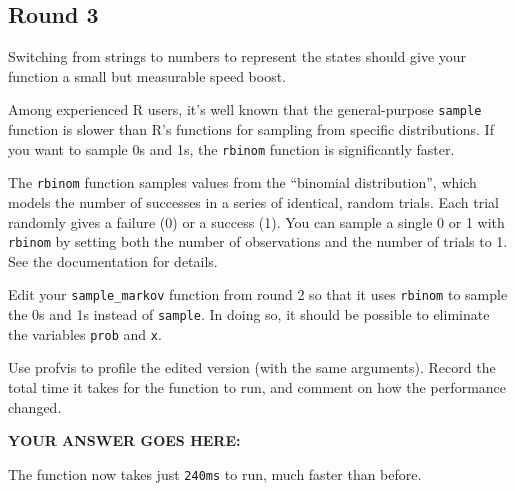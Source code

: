 \documentclass[
]{article}
\begin{document}
\hypertarget{round-3}{%
\subsection{Round 3}\label{round-3}}

Switching from strings to numbers to represent the states should give
your function a small but measurable speed boost.

Among experienced R users, it's well known that the general-purpose
\texttt{sample} function is slower than R's functions for sampling from
specific distributions. If you want to sample 0s and 1s, the
\texttt{rbinom} function is significantly faster.

The \texttt{rbinom} function samples values from the ``binomial
distribution'', which models the number of successes in a series of
identical, random trials. Each trial randomly gives a failure (0) or a
success (1). You can sample a single 0 or 1 with \texttt{rbinom} by
setting both the number of observations and the number of trials to 1.
See the documentation for details.

Edit your \texttt{sample\_markov} function from round 2 so that it uses
\texttt{rbinom} to sample the 0s and 1s instead of \texttt{sample}. In
doing so, it should be possible to eliminate the variables \texttt{prob}
and \texttt{x}.

Use profvis to profile the edited version (with the same arguments).
Record the total time it takes for the function to run, and comment on
how the performance changed.

\textbf{YOUR ANSWER GOES HERE:}

The function now takes just \texttt{240ms} to run, much faster than
before.
\end{document}
